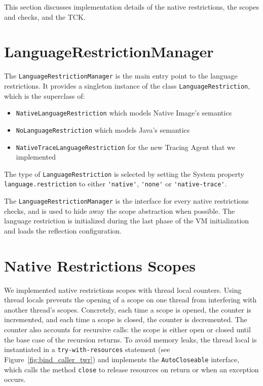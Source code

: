 This section discusses implementation details of the native restrictions, the scopes and checks, and the TCK.

\section{LanguageRestrictionManager}
The \verb|LanguageRestrictionManager| is the main entry point to the language restrictions. It provides a singleton instance of the class \verb|LanguageRestriction|, which is the superclass of: 
\begin{itemize}
    \item \texttt{NativeLanguageRestriction} which models Native Image's semantics
    \item \texttt{NoLanguageRestriction} which  models Java's semantics
    \item \texttt{NativeTraceLanguageRestriction} for the new Tracing Agent that we implemented
\end{itemize}
The type of \verb|LanguageRestriction| is selected by setting the System property \verb|language.restriction| to either \verb|'native'|, \verb|'none'| or \verb|'native-trace'|. 

The \verb|LanguageRestrictionManager| is the interface for every native restrictions checks, and is used to hide away the scope abstraction when possible.
The language restriction is initialized during the last phase of the VM initialization and loads the reflection configuration.
\section{Native Restrictions Scopes}
We implemented native restrictions scopes with thread local counters. Using thread locals prevents the opening of a scope on one thread from interfering with another thread's scopes.
Concretely, each time a scope is opened, the counter is incremented, and each time a scope is closed, the counter is decremented. The counter also accounts for recursive calls: the scope is either open or closed until the base case of the recursion returns.
To avoid memory leaks, the thread local is instantiated in a \verb|try-with-resources| statement (see Figure~\ref{fig:bind_caller_twr}) and implements the \verb|AutoCloseable| interface, which calls the method \verb|close| to release resources on return or when an exception occurs.

